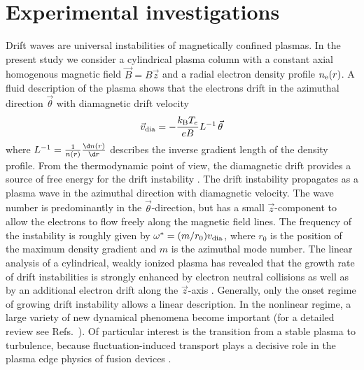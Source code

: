 \section{Experimental investigations}\label{exp}
%
Drift waves are universal instabilities of magnetically confined plasmas.
In the present study we consider a cylindrical plasma 
column with a constant 
axial homogenous magnetic field $\vec{B}=B\vec{z}$ and a radial electron
density profile $n_{\rm e}(r)$. A fluid description \cite{nicholson} of 
the plasma shows that the electrons drift in the azimuthal direction 
$\vec{\theta}$ with diamagnetic drift velocity
%
\begin{equation}
  \vec{v}_{\rm dia}=-\frac{k_{\rm B}T_{e}}{eB}L^{-1}\,\vec{\theta}
\end{equation}
%
where $L^{-1}=\frac{1}{n(r)}\frac{{\d}n(r)}{{\d}r}$ 
describes the inverse gradient 
length of the density profile. From the thermodynamic point of view, the 
diamagnetic drift provides a source of free energy for the drift
instability \cite{krall}. The drift instability propagates as a plasma
wave in the azimuthal direction with diamagnetic velocity. The wave 
number is predominantly in the $\vec{\theta}$-direction, but has
a small $\vec{z}$-component to allow the electrons to flow freely 
along the magnetic field lines. The frequency of the instability 
is roughly given by $\omega^*=(m/r_0)v_{\rm dia}$, where $r_0$ is 
the position of the maximum density gradient and $m$ is the azimuthal 
mode number. The linear analysis of a cylindrical, weakly ionized plasma 
has revealed that the growth rate of drift instabilities is strongly
enhanced by electron neutral collisions as well as by an additional 
electron drift along the $\vec{z}$-axis \cite{ellis80}. 
Generally, only the onset regime of 
growing drift instability allows a linear description.
In the nonlinear regime, a large variety of new dynamical phenomena 
become important (for a detailed review see 
Refs.~\cite{horton84,horton90}). 
Of particular interest is the transition from a stable plasma to 
turbulence, because fluctuation-induced 
transport plays a decisive role 
in the plasma edge physics of fusion devices \cite{carreras92,wagner93}.

